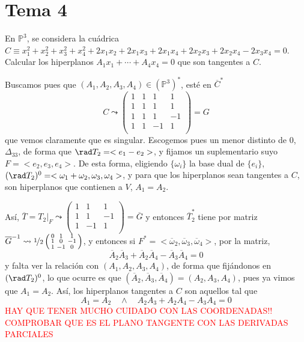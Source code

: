  \section{Tema 4}
 \begin{ejer}
     En $\mathbb P^3$, se considera la cu\'adrica $C\equiv x_1^2+x_2^2 + x_3^2+x_4^2+2x_1x_2+2x_1x_3 + 2x_1x_4+2x_2x_3+2x_2x_4-2x_3x_4 = 0$. Calcular los hiperplanos $A_1x_1+\cdots +A_4x_4=0$ que son tangentes a $C$.
 \end{ejer}
 \begin{sol}
     Buscamos pues que $(A_1,A_2,A_3, A_4) \in (\mathbb P^3)^*$, est\'e en $\overline{C}^*$
     $$C \leadsto \begin{pmatrix}
         1 & 1 & 1 & 1\\ 1 & 1 & 1 & 1\\  1 & 1 & 1 & -1\\  1 & 1 & -1 & 1\\ 
     \end{pmatrix}= G$$
     que vemos claramente que es singular. Escogemos pues un menor distinto de $0$, $\Delta_{33}$, de forma que $\rad T_2 = <e_1-e_2>$, y fijamos un suplementario suyo $F=<e_2,e_3,e_4>$. De esta forma, eligiendo $\{\omega_i\}$ la base dual de $\{e_i\}$, $(\rad T_2)^0 = <\omega_1+\omega_2,\omega_3,\omega_4>$, y para que los hiperplanos sean tangentes a $C$, son hiperplanos que contienen a $V$, $A_1 = A_2$. 

     As\'i, $\overline{T}=T_2|_F \leadsto \left(\begin{smallmatrix}
         1 & 1 & 1  \\ 1 & 1 & -1  \\ 1 & -1 & 1  \\
     \end{smallmatrix}\right)=\overline G$ y entonces $\overline{T}_2^*$ tiene por matriz $\overline{G}^{-1} \leadsto\nicefrac{1}{2}\left( \begin{smallmatrix}
         0 & 1 & 1 \\ 1 & 0 & -1 \\ 1 & -1 & 0
     \end{smallmatrix}\right)$, y entonces si $F^*=< \overline{\omega}_2, \overline{\omega}_3, \overline{\omega}_4>$, por la matriz, 
     $$\overline{A}_2\overline{A}_3+\overline{A}_2\overline{A}_4-\overline{A}_3\overline{A}_4 = 0$$
     y falta ver la relaci\'on con $(A_1,A_2,A_3,A_4)$, de forma que fij\'andonos en $(\rad T_2)^0$, lo que ocurre es que $(\overline{A}_2, \overline{A}_3, \overline{A}_4) = (A_2,A_3,A_4)$, pues ya vimos que $A_1=A_2$. As\'i, los hiperplanos tangentes a $C$ son aquellos tal que 
     $$ A_1=A_2 \quad \wedge \quad A_2A_3+A_2A_4-A_3A_4 = 0$$
     \textcolor{red}{HAY QUE TENER MUCHO CUIDADO CON LAS COORDENADAS!! COMPROBAR QUE ES EL PLANO TANGENTE CON LAS DERIVADAS PARCIALES}
 \end{sol}
